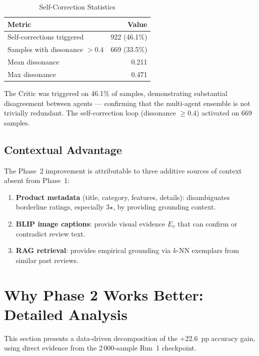 \documentclass[12pt,a4paper]{article}
\begin{document}
\begin{table}[H]
\centering
\caption{Self-Correction Statistics}
\begin{tabular}{lr}
\toprule
\textbf{Metric} & \textbf{Value} \\
\midrule
Self-corrections triggered      & 922 (46.1\%) \\
Samples with dissonance $> 0.4$ & 669 (33.5\%) \\
Mean dissonance                 & 0.211 \\
Max dissonance                  & 0.471 \\
\bottomrule
\end{tabular}
\end{table}

\noindent The Critic was triggered on 46.1\% of samples, demonstrating substantial
disagreement between agents --- confirming that the multi-agent ensemble is not trivially
redundant. The self-correction loop (dissonance $\geq 0.4$) activated on 669 samples.

\subsection{Contextual Advantage}

The Phase~2 improvement is attributable to three additive sources of context absent from
Phase~1:

\begin{enumerate}[leftmargin=*]
  \item \textbf{Product metadata} (title, category, features, details): disambiguates
    borderline ratings, especially 3$\star$, by providing grounding context.
  \item \textbf{BLIP image captions}: provide visual evidence $E_v$ that can confirm or
    contradict review text.
  \item \textbf{RAG retrieval}: provides empirical grounding via $k$-NN exemplars from
    similar past reviews.
\end{enumerate}

\section{Why Phase 2 Works Better: Detailed Analysis}

This section presents a data-driven decomposition of the +22.6~pp accuracy gain, using
direct evidence from the 2\,000-sample Run~1 checkpoint.
\end{document}
